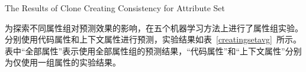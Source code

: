 
{The Results of Clone Creating Consistency for Attribute Set}

为探索不同属性组对预测效果的影响，在五个机器学习方法上进行了属性组实验。分别使用代码属性和上下文属性进行预测，实验结果如表~\ref{creatingsetavg}~所示。表中“全部属性”表示使用全部属性组的预测结果，“代码属性”和“上下文属性”分别为仅使用一组属性的实验结果。

